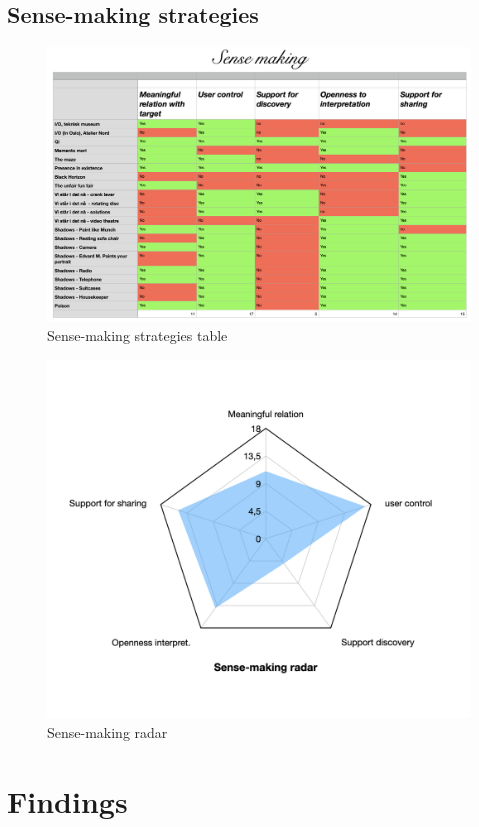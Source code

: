 \subsection{Sense-making strategies}
\begin{figure}[H]
\includegraphics[width=20cm, angle=90]{pictures/analysis/sense.png}
\caption{Sense-making strategies table}
\centering 
\end{figure}

\begin{figure}[H]
\includegraphics[width=12.5cm]{pictures/analysis/sense_radar.png}
\caption{Sense-making radar}
\centering 
\end{figure}


\section{Findings}

